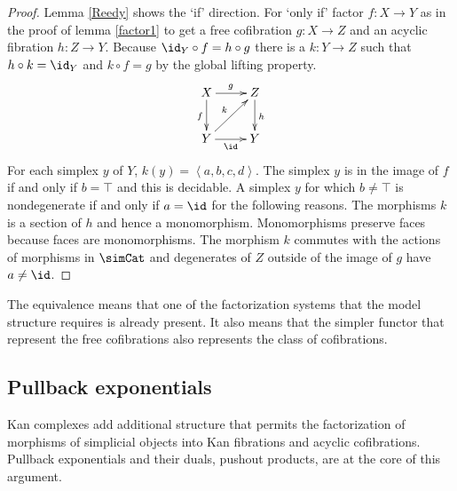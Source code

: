 \documentclass{tac}
\newcommand\of{:}
\newcommand\tuplet[1]{\left\langle #1 \right\rangle}
\begin{document}
\begin{proof} Lemma \ref{Reedy} shows the `if' direction. For `only if' factor $f\of X\to Y$ as in the proof of lemma \ref{factor1} to get a free cofibration $g\of X\to Z$ and an acyclic fibration $h\of Z\to Y$. Because $\id_Y\circ f = h\circ g$ there is a $k\of Y\to Z$ such that $h\circ k = \id_Y$ and $k\circ f = g$ by the global lifting property. 
\[
\xymatrix{
X\ar[d]_f \ar[r]^g & Z\ar[d]^h\\
Y\ar[r]_\id \ar[ur]^k & Y
}
\]
For each simplex $y$ of $Y$, $k(y)=\tuplet{a,b,c,d}$. The simplex $y$ is in the image of $f$ if and only if $b=\top$ and this is decidable. A simplex $y$ for which $b\neq \top$ is nondegenerate if and only if $a=\id$ for the following reasons. The morphisms $k$ is a section of $h$ and hence a monomorphism. Monomorphisms preserve faces because faces are monomorphisms. The morphism $k$ commutes with the actions of morphisms in $\simCat$ and degenerates of $Z$ outside of the image of $g$ have $a\neq\id$.
\end{proof}

The equivalence means that one of the factorization systems that the model structure requires is already present. It also means that the simpler functor that represent the free cofibrations also represents the class of cofibrations.

\subsection{Pullback exponentials}
Kan complexes add additional structure that permits the factorization of morphisms of simplicial objects into Kan fibrations and acyclic cofibrations. Pullback exponentials and their duals, pushout products, are at the core of this argument.
\end{document}
